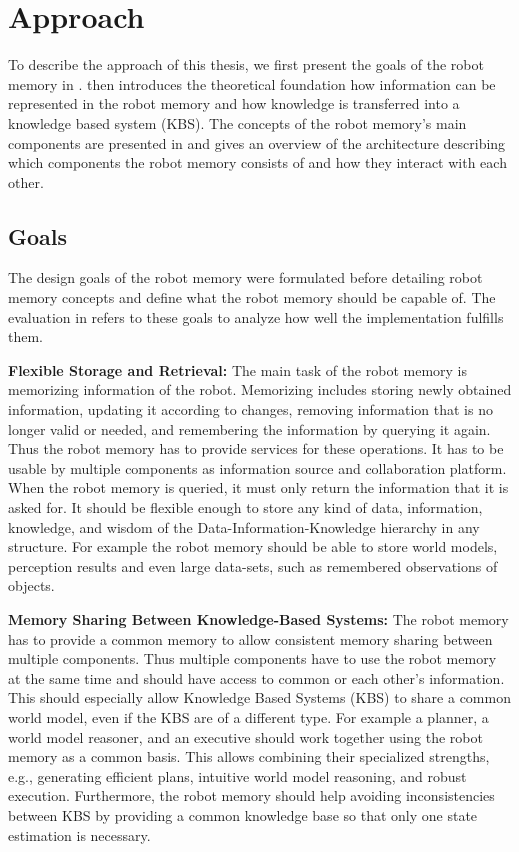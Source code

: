 \chapter{Approach}
\label{chap:approach}
To describe the approach of this thesis, we first present the
goals of the robot memory in .
 then introduces the theoretical
foundation how information can be represented in the robot memory and
how knowledge is transferred into a knowledge based system (KBS). The
concepts of the robot memory's main components are presented in
 and  gives an overview
of the architecture describing which components the robot
memory consists of and how they interact with each other.

\section{Goals}
\label{sec:goals}
The design goals of the robot memory were
formulated before detailing robot memory concepts and
define what the robot memory should be capable of. The evaluation in
 refers to these goals to analyze how well
the implementation fulfills them.

\textbf{Flexible Storage and Retrieval:} The main task of
the robot memory is memorizing information of the robot. Memorizing
includes storing newly obtained information, updating it according to
changes, removing information that is no longer valid or needed, and
remembering the information by querying it again. Thus the robot
memory has to provide services for these operations.  It has to be usable by multiple components
as information source and collaboration platform.  When the robot memory is queried, it must
only return the information that it is asked for. It should be flexible
enough to store any kind of data, information, knowledge, and wisdom
of the Data-Information-Knowledge hierarchy in any structure. For example the robot memory
should be able to store world models, perception results and even
large data-sets, such as remembered observations of objects.

\textbf{Memory Sharing Between Knowledge-Based Systems:}
The robot memory has to provide a common memory to allow consistent
memory sharing between multiple components. Thus multiple components have to
use the robot memory at the same time and should have access to common
or each other's information. This should especially allow Knowledge
Based Systems (KBS) to share a common world model, even if the KBS are
of a different type. For example a planner, a world model reasoner,
and an executive should work together using the robot memory as a
common basis. This allows combining their specialized strengths,
e.g., generating efficient plans, intuitive world model reasoning, and
robust execution. Furthermore, the robot memory should help avoiding
inconsistencies between KBS by providing a common knowledge base so that
only one state estimation is necessary.

